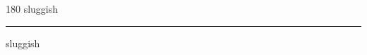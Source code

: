 
\begin{frame}
\begin{center}
\begin{turn}{180}
{\fontsize{2.5cm}{1em}\selectfont sluggish}
\end{turn}
\vspace{1em}\par  
\hrule
\vspace{1em}\par  
{\fontsize{2.5cm}{1em}\selectfont sluggish}
\end{center}
\end{frame}
